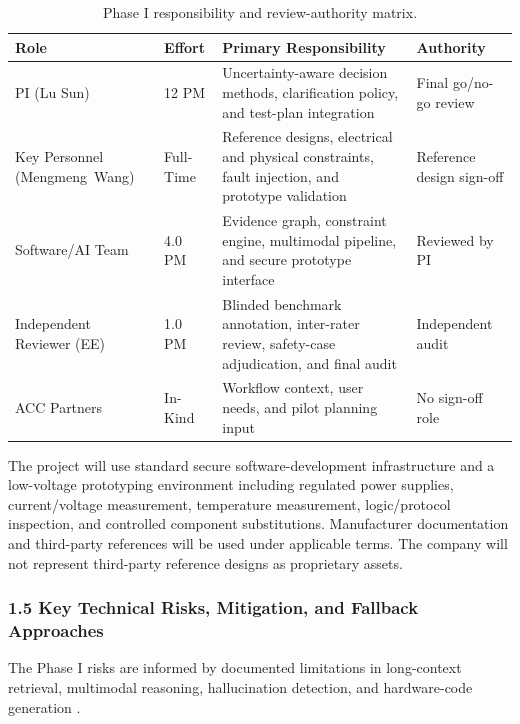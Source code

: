 \vspace{-3pt}
\begin{table}[H]
\centering
\small
\begin{tabularx}{\textwidth}{P{0.15\textwidth}P{0.10\textwidth}YP{0.16\textwidth}}
\toprule
{\textbf{Role}} &
{\textbf{Effort}} &
{\textbf{Primary Responsibility}} &
{\textbf{Authority}} \\
\midrule
PI (Lu Sun) & 12 PM & Uncertainty-aware decision methods, clarification policy, and test-plan integration & Final go/no-go review \\
Key Personnel (\mbox{Mengmeng Wang}) & Full-Time & Reference designs, electrical and physical constraints, fault injection, and prototype validation & Reference design sign-off \\
Software/AI Team & 4.0 PM & Evidence graph, constraint engine, multimodal pipeline, and secure prototype interface & Reviewed by PI \\
Independent Reviewer (EE) & 1.0 PM & Blinded benchmark annotation, inter-rater review, safety-case adjudication, and final audit & Independent audit \\
ACC Partners & In-Kind & Workflow context, user needs, and pilot planning input & No sign-off role \\
\toprule
\end{tabularx}
\caption{Phase I responsibility and review-authority matrix.}
\label{tab:team}
\end{table}
\vspace{-10pt}

The project will use standard secure software-development infrastructure and a low-voltage prototyping environment including regulated power supplies, current/voltage measurement, temperature measurement, logic/protocol inspection, and controlled component substitutions. Manufacturer documentation and third-party references will be used under applicable terms. The company will not represent third-party reference designs as proprietary assets.

\subsubsection*{1.5 Key Technical Risks, Mitigation, and Fallback Approaches}

The Phase I risks 
are informed by documented limitations in long-context retrieval, multimodal reasoning, hallucination detection, and hardware-code generation \cite{liu2024lostmiddle,yue2024mmmu, farquhar2024semanticentropy,liu2023verilogeval, thakur2024verigen,liu2023trustworthyllms}.

